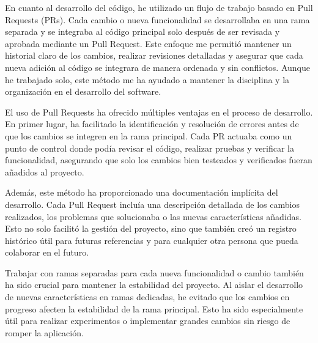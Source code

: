 En cuanto al desarrollo del código, he utilizado un flujo de trabajo basado en Pull Requests (PRs). Cada cambio o nueva 
funcionalidad se desarrollaba en una rama separada y se integraba al código principal solo después de ser revisada y aprobada 
mediante un Pull Request. Este enfoque me permitió mantener un historial claro de los cambios, realizar revisiones detalladas y 
asegurar que cada nueva adición al código se integrara de manera ordenada y sin conflictos. Aunque he trabajado solo, este método 
me ha ayudado a mantener la disciplina y la organización en el desarrollo del software.

El uso de Pull Requests ha ofrecido múltiples ventajas en el proceso de desarrollo. En primer lugar, ha facilitado la identificación y 
resolución de errores antes de que los cambios se integren en la rama principal. Cada PR actuaba como un punto de control donde podía revisar 
el código, realizar pruebas y verificar la funcionalidad, asegurando que solo los cambios bien testeados y verificados fueran añadidos al proyecto.

Además, este método ha proporcionado una documentación implícita del desarrollo. Cada Pull Request incluía una descripción detallada de los 
cambios realizados, los problemas que solucionaba o las nuevas características añadidas. Esto no solo facilitó la gestión del proyecto, sino 
que también creó un registro histórico útil para futuras referencias y para cualquier otra persona que pueda colaborar en el futuro.

Trabajar con ramas separadas para cada nueva funcionalidad o cambio también ha sido crucial para mantener la estabilidad del proyecto. Al aislar el 
desarrollo de nuevas características en ramas dedicadas, he evitado que los cambios en progreso afecten la estabilidad de la rama principal. Esto ha 
sido especialmente útil para realizar experimentos o implementar grandes cambios sin riesgo de romper la aplicación.


